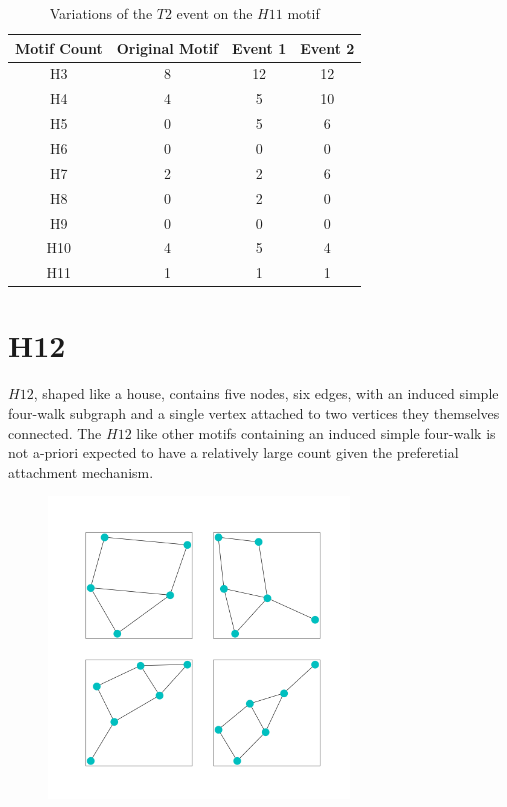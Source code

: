 \begin{table}
    \centering
    \begin{tabular}{||c c c c||} 
    \hline
    Motif Count & Original Motif & Event 1 & Event 2 \\ [0.5ex] 
    \hline\hline
    H3 & 8 & 12 & 12 \\ 
    \hline
    H4 & 4 & 5 & 10  \\
    \hline
    H5 & 0 & 5 & 6  \\
    \hline
    H6 & 0 & 0 & 0  \\
    \hline
    H7 & 2 & 2 & 6 \\
    \hline
    H8 & 0 & 2 & 0 \\
    \hline
    H9 & 0 & 0 & 0 \\
    \hline
    H10 & 4 & 5 & 4 \\
    \hline
    H11 & 1 & 1 & 1\\
    \hline
   \end{tabular}
   \caption{Variations of the $T2$ event on the $H11$ motif}
   \label{table:9}
\end{table}

\FloatBarrier

\section{H12}
$H12$, shaped like a house, contains five nodes, six edges, with an induced simple four-walk subgraph
and a single vertex attached to two vertices they themselves connected. The $H12$ like other
motifs containing an induced simple four-walk is not a-priori expected to have a relatively large count
given the preferetial attachment mechanism. 

\begin{figure}[!ht]
    \includegraphics[width=8cm]{Images/H12_evolution.png}
    \centering
\end{figure}


